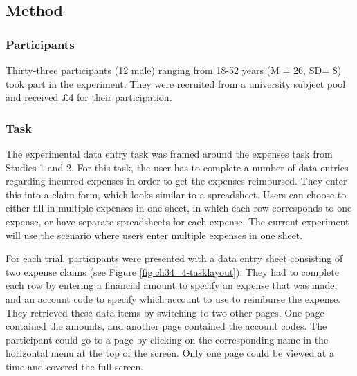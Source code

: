 \subsection{Method}
\subsubsection{Participants}
Thirty-three participants (12 male) ranging from 18-52 years (M = 26, SD= 8) took part in the experiment. They were recruited from a university subject pool and received $\pounds$4 for their participation.

\subsubsection{Task}
The experimental data entry task was framed around the expenses task from Studies 1 and 2. For this task, the user has to complete a number of data entries regarding incurred expenses in order to get the expenses reimbursed. They enter this into a claim form, which looks similar to a spreadsheet. Users can choose to either fill in multiple expenses in one sheet, in which each row corresponds to one expense, or have separate spreadsheets for each expense. The current experiment will use the scenario where users enter multiple expenses in one sheet.

For each trial, participants were presented with a data entry sheet consisting of two expense claims (see Figure \ref{fig:ch34_4-tasklayout}). They had to complete each row by entering a financial amount to specify an expense that was made, and an account code to specify which account to use to reimburse the expense. They retrieved these data items by switching to two other pages. One page contained the amounts, and another page contained the account codes. The participant could go to a page by clicking on the corresponding name in the horizontal menu at the top of the screen. Only one page could be viewed at a time and covered the full screen. 

